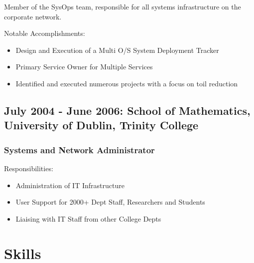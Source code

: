 \documentclass[a4paper, 10pt] {article}
\begin{document}
Member of the SysOps team, responsible for all systems infrastructure on the corporate network.

\vspace{5mm} %

Notable Accomplishments:

\begin{itemize}[itemsep=2pt,parsep=2pt]
  \item Design and Execution of a Multi O/S System Deployment Tracker
  \item Primary Service Owner for Multiple Services
  \item Identified and executed numerous projects with a focus on toil reduction
\end{itemize}

\subsection*{July 2004 - June 2006: School of Mathematics, University of Dublin, Trinity College}

\subsubsection*{Systems and Network Administrator}

Responsibilities:

\begin{itemize}[itemsep=2pt,parsep=2pt]
  \item Administration of IT Infrastructure
  \item User Support for 2000+ Dept Staff, Researchers and Students
  \item Liaising with IT Staff from other College Depts
\end{itemize}

\section*{Skills}
\end{document}
